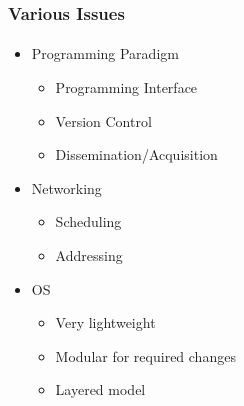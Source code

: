 \documentclass{beamer}
\newcommand{\newframe}[3]{
\begin{frame}
\frametitle{#1}
\framesubtitle{#2}
#3
\end{frame}
}
\begin{document}
\newframe{Various Issues}{}{
\begin{itemize}
   \item<2-> Programming Paradigm
   \begin{itemize}
      \item<3-> Programming Interface
      \item<4-> Version Control
      \item<5-> Dissemination/Acquisition
   \end{itemize}
   \item<6-> Networking
   \begin{itemize}
      \item<7-> Scheduling
      \item<8-> Addressing
   \end{itemize}
   \item<9-> OS
   \begin{itemize}
      \item<10-> Very lightweight
      \item<11-> Modular for required changes
      \item<12-> Layered model
   \end{itemize}
\end{itemize}
}
\end{document}
